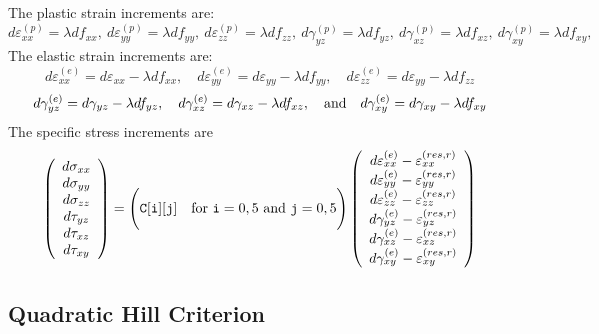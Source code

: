 \documentclass[11pt]{article}
\def\code#1{{\small\tt #1}}
\def\err#1{\varepsilon_{#1}^{(res,r)}}
\def\fvvec#1#2#3#4#5#6{\left(\begin{array}{ccc} #1 \\ #2 \\ #3 \\ #4 \\ #5 \\ #6 \end{array}\right)}
\def\g#1{\gamma_{#1}}
\def\s#1{\sigma_{#1}}
\def\t#1{\tau_{#1}}
\begin{document}
 The plastic strain increments are:
\begin{equation}
       d\varepsilon_{xx}^{(p)} = \lambda df_{xx}, \ 
       d\varepsilon_{yy}^{(p)} = \lambda df_{yy}, \ 
       d\varepsilon_{zz}^{(p)} = \lambda df_{zz}, \ 
       d\gamma_{yz}^{(p)} =  \lambda df_{yz}, \ 
       d\gamma_{xz}^{(p)} =  \lambda df_{xz}, \ 
       d\gamma_{xy}^{(p)} =  \lambda df_{xy},
\end{equation}
The elastic strain increments are:
\begin{equation}
       d\varepsilon_{xx}^{(e)} = d\varepsilon_{xx} -\lambda df_{xx}, \quad
       d\varepsilon_{yy}^{(e)} = d\varepsilon_{yy} -\lambda df_{yy}, \quad
       d\varepsilon_{zz}^{(e)} =  d\varepsilon_{yy} -\lambda df_{zz}
\end{equation}
\begin{equation}
       d\gamma_{yz}^{(e)} = d\gamma_{yz} -  \lambda df_{yz}, \quad 
       d\gamma_{xz}^{(e)} = d\gamma_{xz} -  \lambda df_{xz}, \quad  {\rm and} \quad
       d\gamma_{xy}^{(e)} = d\gamma_{xy} -  \lambda df_{xy}
\end{equation}
The specific stress increments are
\begin{equation}
      \fvvec{d\s{xx}}{d\s{yy}}{d\s{zz}}{d\t{yz}}{d\t{xz}}{d\t{xy}} = \Biggl(\code{C[i][j]} \quad {\rm for\ }\code{i}=0,5\ {\rm and\ }\code{j}=0,5\Biggr)
          \fvvec{d\varepsilon_{xx}^{(e)}  - \err{xx}}{d\varepsilon_{yy}^{(e)}  -\err{yy}}{d\varepsilon_{zz}^{(e)}  -\err{zz}}
                             {d\g{yz}^{(e)}-\err{yz}}{d\g{xz}^{(e)}-\err{xz}}{d\g{xy}^{(e)}-\err{xy}}
 \end{equation}

\subsection{Quadratic Hill Criterion}
\end{document}
